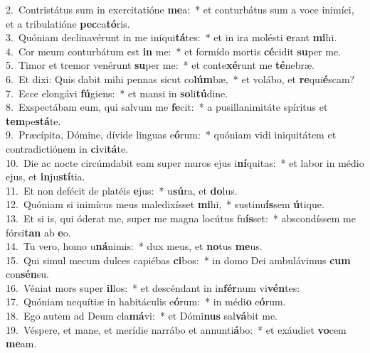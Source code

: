 {2.~}Contristátus sum in exercitatióne \textbf{me}a:~* et conturbátus sum a voce inimíci, et a tribulatióne \textbf{pec}ca\textbf{tó}ris.\\
{3.~}Quóniam declinavérunt in me iniqui\textbf{tá}tes:~* et in ira molésti \textbf{e}rant \textbf{mi}hi.\\
{4.~}Cor meum conturbátum est \textbf{in} me:~* et formído mortis \textbf{cé}cidit \textbf{su}per me.\\
{5.~}Timor et tremor venérunt \textbf{su}per me:~* et conte\textbf{xé}runt me \textbf{té}nebræ.\\
{6.~}Et dixi: Quis dabit mihi pennas sicut co\textbf{lúm}bæ,~* et volábo, et \textbf{re}qui\textbf{é}scam?\\
{7.~}Ecce elongávi \textbf{fú}giens:~* et mansi in \textbf{so}li\textbf{tú}dine.\\
{8.~}Exspectábam eum, qui salvum me \textbf{fe}cit:~* a pusillanimitáte spíritus et \textbf{tem}pe\textbf{stá}te.\\
{9.~}Præcípita, Dómine, dívide linguas e\textbf{ó}rum:~* quóniam vidi iniquitátem et contradictiónem in \textbf{ci}vi\textbf{tá}te.\\
{10.~}Die ac nocte circúmdabit eam super muros ejus i\textbf{ní}quitas:~* et labor in médio ejus, et \textbf{in}ju\textbf{stí}tia.\\
{11.~}Et non defécit de platéis \textbf{e}jus:~* u\textbf{sú}ra, et \textbf{do}lus.\\
{12.~}Quóniam si inimícus meus maledixísset \textbf{mi}hi,~* sustinu\textbf{ís}sem \textbf{ú}tique.\\
{13.~}Et si is, qui óderat me, super me magna locútus fu\textbf{ís}set:~* abscondíssem me fórsi\textbf{tan} ab \textbf{e}o.\\
{14.~}Tu vero, homo u\textbf{ná}nimis:~* dux meus, et \textbf{no}tus \textbf{me}us.\\
{15.~}Qui simul mecum dulces capiébas \textbf{ci}bos:~* in domo Dei ambulávimus \textbf{cum} con\textbf{sén}su.\\
{16.~}Véniat mors super \textbf{il}los:~* et descéndant in in\textbf{fér}num vi\textbf{vén}tes:\\
{17.~}Quóniam nequítiæ in habitáculis e\textbf{ó}rum:~* in médi\textbf{o} e\textbf{ó}rum.\\
{18.~}Ego autem ad Deum cla\textbf{má}vi:~* et Dómi\textbf{nus} sal\textbf{vá}bit me.\\
{19.~}Véspere, et mane, et merídie narrábo et annunti\textbf{á}bo:~* et exáudiet \textbf{vo}cem \textbf{me}am.\\

